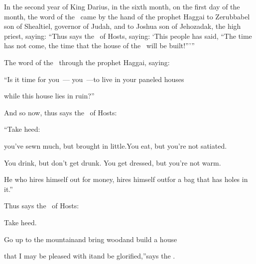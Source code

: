 
\begin{inparaenum}
   In the second year of King Darius, in the sixth month, on the first day of the month, the word of the \lord\ came by the hand of the prophet Haggai to Zerubbabel son of Shealtiel, governor of Judah, and to Joshua son of Jehozadak, the high priest, saying:%
   ``Thus says the \lord\ of Hosts, saying: `This people has said, ``The time has not come, the time that the house of the \lord\ will be built!''\thinspace'\thinspace''%
  
   The word of the \lord\ through the prophet Haggai, saying:\smallskip%
  
  \pc {} ``Is it time for you~--- you~---\pa to live in your paneled houses%
  
  \pd while this house lies in ruin?''%
  
  \pc {} And so now, thus says the \lord\ of Hosts:%
  
  \pd ``Take heed:%
  
  \pc {} you've sewn much, but brought in little.\pa You eat, but you're not satiated.%
  
  \pd You drink, but don't get drunk.%
  \pa You get dressed, but you're not warm.%
  
  \pd He who hires himself out for money, hires himself out\pa for a bag that has holes in it.''\bigskip%
  
   Thus says the \lord\ of Hosts:\smallskip%
  
  \pd Take heed.%
  
  \pc {} Go up to the mountain\pa and bring wood\pa and build a house%
  
  \pd that I may be pleased with it\pa and be glorified,''\pa says the \lord.%
  

\end{inparaenum}
